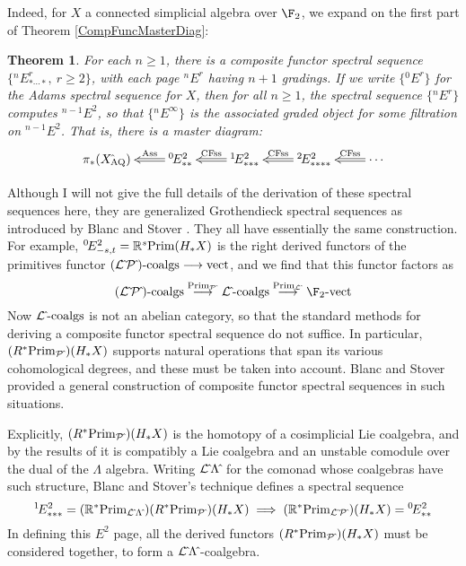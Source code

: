 \documentclass[11pt]{article}
\theoremstyle{plain}
\newtheorem{theorem}{Theorem}
\renewcommand*{\thetheorem}{\Alph{theorem}}
\begin{document}
Indeed, for $X$ a connected simplicial algebra over $\F_2$, we expand on the first part of Theorem \ref{CompFuncMasterDiag}:
{
\renewcommand{\thetheorem}{\ref{CompFuncMasterDiag}.1}
\begin{theorem}
For each $n\geq1$, there is a composite functor spectral sequence $\{{^{n\!}}E^r_{*\cdots *},\ r\geq2\}$, with each page ${^{n\!}}E^r$ having $n+1$ gradings. If we write $\{{^{0\!}}E^r\}$ for the Adams spectral sequence for $X$, then for all $n\geq1$, the spectral sequence $\{{^{n\!}}E^r\}$ computes ${^{n-1\!}}E^2$, so that $\{{^{n\!}}E^\infty\}$ is the associated graded object for some filtration on ${^{n-1\!}}E^2$. That is, there is a master diagram:
\[\xymatrix@R=4mm{
\pi_{*}(X{\hat{\,}_\textup{\!\!AQ}})&%
\ar@{=>}[l]_-{\textup{Ass}}
{^{0\!}}E^2_{**}&%
\ar@{=>}[l]_-{\textup{CFss}}
{^{1\!}}E^2_{***}
&%
{^{2\!}}E^2_{****}
\ar@{=>}[l]_-{\textup{CFss}}&%
\cdots
\ar@{=>}[l]_-{\textup{CFss}}%
}\]
\end{theorem}
}
\noindent Although I will not give the full details of the derivation of these spectral sequences here, they are generalized Grothendieck spectral sequences as introduced by Blanc and Stover \cite{Blanc_Stover-Groth_SS.pdf}. They all have essentially the same construction. For example, ${^{0\!}}E^2_{-s,t}=\mathbb{R}^s\textup{Prim}(H_*X)$ is the right derived functors of the primitives functor $(\mathcal{L}{\hat{\,}}\mathcal{P}{\hat{\,}})\textup{-coalgs}\longrightarrow \textup{vect}$, and we find that this functor factors as
\[(\calL{\hat{\,}}\calP{\hat{\,}})\textup{-coalgs}\overset{\textup{Prim}_{\calP{\hat{\,}}}}{\to}
\calL{\hat{\,}}\textup{-coalgs}\overset{\textup{Prim}_{\calL{\hat{\,}}}}{\to}
 \F_2\textup{-vect}\]
Now $\mathcal{L}{\hat{\,}}\textup{-coalgs}$ is not an abelian category, so that the standard methods for deriving a composite functor spectral sequence do not suffice. In particular, $(R^*\textup{Prim}_{\mathcal{P}{\hat{\,}}})(H_*X)$ supports natural operations that span its various cohomological degrees, and these must be taken into account. Blanc and Stover provided a general construction of composite functor spectral sequences in such situations.

Explicitly, $(R^*\textup{Prim}_{\mathcal{P}{\hat{\,}}})(H_*X)$ is the homotopy of a cosimplicial Lie coalgebra, and by the results of \cite{6Author.pdf} it is compatibly a Lie coalgebra and an unstable comodule over the dual of the $\Lambda$ algebra. Writing $\mathcal{L}{\hat{\,}}\Lambda{\hat{\,}}$ for the comonad whose coalgebras have such structure, Blanc and Stover's technique defines a spectral sequence \[{^{1\!}}E^2_{***}= (\mathbb{R}^* \textup{Prim}_{\mathcal{L}{\hat{\,}}\Lambda{\hat{\,}}})(R^*\textup{Prim}_{\mathcal{P}{\hat{\,}}})(H_*X) \implies (\mathbb{R}^* \textup{Prim}_{\mathcal{L}{\hat{\,}}\mathcal{P}{\hat{\,}}})(H_*X)={^{0\!}}E^2_{**}\]
In defining this $E^2$ page, all the derived functors $(R^*\textup{Prim}_{\mathcal{P}{\hat{\,}}})(H_*X)$ must be considered together, to form a $\mathcal{L}{\hat{\,}}\Lambda{\hat{\,}}$-coalgebra.
\end{document}
